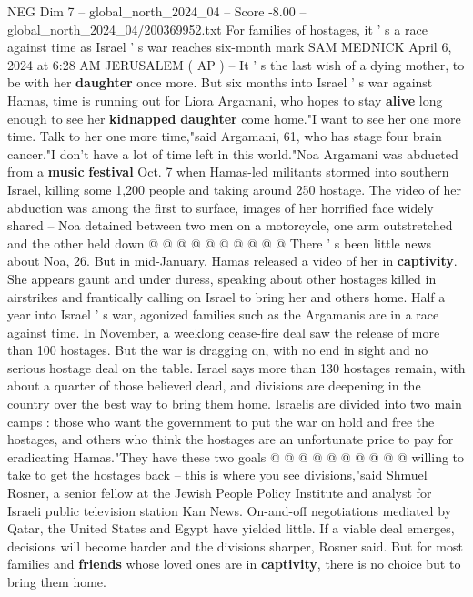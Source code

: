 \begin{textsample}{NEG Dim 7 – global\_north\_2024\_04 – Score -8.00 – global\_north\_2024\_04/200369952.txt}  \label{ex:f7_neg_228}
For families of hostages, it ' s a race against time as Israel ' s war reaches six-month mark SAM MEDNICK April 6, 2024 at 6:28 AM JERUSALEM ( AP ) -- It ' s the last wish of a dying mother, to be with her \textbf{daughter} once more.
But six months into Israel ' s war against Hamas, time is running out for Liora Argamani, who hopes to stay \textbf{alive} long enough to see her \textbf{kidnapped} \textbf{daughter} come home."I want to see her one more time.
Talk to her one more time,"said Argamani, 61, who has stage four brain cancer."I don't have a lot of time left in this world."Noa Argamani was abducted from a \textbf{music} \textbf{festival} Oct. 7 when Hamas-led militants stormed into southern Israel, killing some 1,200 people and taking around 250 hostage.
The video of her abduction was among the first to surface, images of her horrified face widely shared -- Noa detained between two men on a motorcycle, one arm outstretched and the other held down @ @ @ @ @ @ @ @ @ @ There ' s been little news about Noa, 26.
But in mid-January, Hamas released a video of her in \textbf{captivity}.
She appears gaunt and under duress, speaking about other hostages killed in airstrikes and frantically calling on Israel to bring her and others home.
Half a year into Israel ' s war, agonized families such as the Argamanis are in a race against time.
In November, a weeklong cease-fire deal saw the release of more than 100 hostages.
But the war is dragging on, with no end in sight and no serious hostage deal on the table.
Israel says more than 130 hostages remain, with about a quarter of those believed dead, and divisions are deepening in the country over the best way to bring them home.
Israelis are divided into two main camps : those who want the government to put the war on hold and free the hostages, and others who think the hostages are an unfortunate price to pay for eradicating Hamas."They have these two goals @ @ @ @ @ @ @ @ @ @ willing to take to get the hostages back -- this is where you see divisions,"said Shmuel Rosner, a senior fellow at the Jewish People Policy Institute and analyst for Israeli public television station Kan News.
On-and-off negotiations mediated by Qatar, the United States and Egypt have yielded little.
If a viable deal emerges, decisions will become harder and the divisions sharper, Rosner said.
But for most families and \textbf{friends} whose loved ones are in \textbf{captivity}, there is no choice but to bring them home.

\end{textsample}
